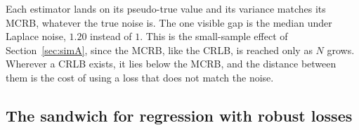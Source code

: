 \documentclass[11pt]{article}
\numberwithin{figure}{section}
\numberwithin{equation}{section}
\begin{document}
\begin{table}[H]
\centering
{}
\caption{Location estimation with $A = 1$, $N = 100$, $5000$ trials. The mean is the MLE of a
Gaussian model and the median is the MLE of a Laplace model. For gamma and exponential noise the
median's MCRB is a variance about its pseudo-true value, not about $A$.}
\label{tab:simF-location}
\end{table}

Each estimator lands on its pseudo-true value and its variance matches its MCRB, whatever the true
noise is. The one visible gap is the median under Laplace noise, $1.20$ instead of $1$. This is the
small-sample effect of Section~\ref{sec:simA}, since the MCRB, like the CRLB, is reached only as
$N$ grows. Wherever a CRLB exists, it lies below the MCRB, and the distance between them is the cost
of using a loss that does not match the noise.

\subsection{The sandwich for regression with robust losses}
\label{sec:mcrb-reg}
\end{document}
